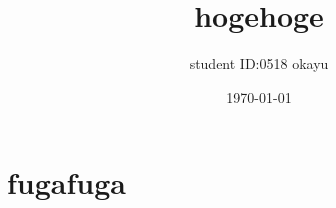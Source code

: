 \documentclass[a4paper, dvipdfmx]{jsarticle}
\title{\Large{hogehoge}}
\author{
	student ID:0518
	okayu
}
\date{\today}
\begin{document}
\maketitle


\section*{fugafuga}
\end{document}

